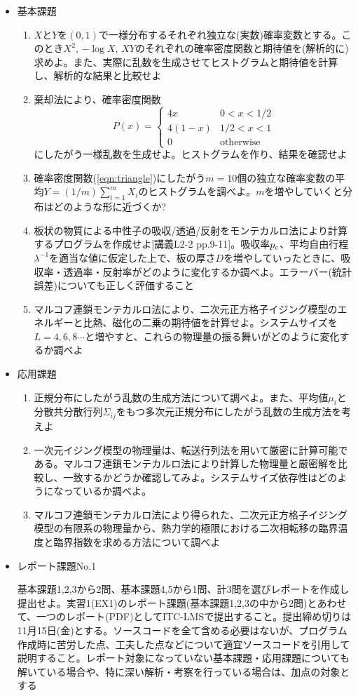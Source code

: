 \documentclass[11pt]{jarticle}
\begin{document}
\begin{itemize}
\item 基本課題
  \begin{enumerate}
  \item $X$と$Y$を$(0,1)$で一様分布するそれぞれ独立な(実数)確率変数とする。このとき$X^2$, $-\log X$, $XY$のそれぞれの確率密度関数と期待値を(解析的に)求めよ。また、実際に乱数を生成させてヒストグラムと期待値を計算し、解析的な結果と比較せよ
  \item 棄却法により、確率密度関数
    \begin{equation}
      P(x) = \begin{cases} 4x & 0 < x < 1/2 \\
        4(1-x) & 1/2 < x < 1 \\
        0 & \text{otherwise}
      \end{cases}
      \label{eqn:triangle}
    \end{equation}
    にしたがう一様乱数を生成せよ。ヒストグラムを作り、結果を確認せよ
  \item 確率密度関数(\ref{eqn:triangle})にしたがう$m=10$個の独立な確率変数の平均$Y=(1/m) \sum_{i=1}^m X_i$のヒストグラムを調べよ。$m$を増やしていくと分布はどのような形に近づくか?
  \item 板状の物質による中性子の吸収/透過/反射をモンテカルロ法により計算するプログラムを作成せよ[講義L2-2 pp.9-11]。吸収率$p_{\rm c}$、平均自由行程$\lambda^{-1}$を適当な値に仮定した上で、板の厚さ$D$を増やしていったときに、吸収率・透過率・反射率がどのように変化するか調べよ。エラーバー(統計誤差)についても正しく評価すること
  \item マルコフ連鎖モンテカルロ法により、二次元正方格子イジング模型のエネルギーと比熱、磁化の二乗の期待値を計算せよ。システムサイズを$L=4, 6,8\cdots$と増やすと、これらの物理量の振る舞いがどのように変化するか調べよ
  \end{enumerate}  
\item 応用課題
  \begin{enumerate}
  \item 正規分布にしたがう乱数の生成方法について調べよ。また、平均値$\mu_i$と分散共分散行列$\Sigma_{ij}$をもつ多次元正規分布にしたがう乱数の生成方法を考えよ
  \item 一次元イジング模型の物理量は、転送行列法を用いて厳密に計算可能である。マルコフ連鎖モンテカルロ法により計算した物理量と厳密解を比較し、一致するかどうか確認してみよ。システムサイズ依存性はどのようになっているか調べよ。
  \item マルコフ連鎖モンテカルロ法により得られた、二次元正方格子イジング模型の有限系の物理量から、熱力学的極限における二次相転移の臨界温度と臨界指数を求める方法について調べよ
  \end{enumerate}

\item レポート課題No.1

  基本課題1,2,3から2問、基本課題4,5から1問、計3問を選びレポートを作成し提出せよ。実習1(EX1)のレポート課題(基本課題1,2,3の中から2問)とあわせて、一つのレポート(PDF)としてITC-LMSで提出すること。提出締め切りは11月15日(金)とする。ソースコードを全て含める必要はないが、プログラム作成時に苦労した点、工夫した点などについて適宜ソースコードを引用して説明すること。レポート対象になっていない基本課題・応用課題についても解いている場合や、特に深い解析・考察を行っている場合は、加点の対象とする
\end{itemize}
\end{document}
